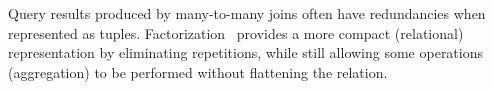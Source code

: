 
Query results produced by many-to-many joins often have redundancies when
represented as tuples. Factorization~\cite{DBLP:journals/sigmod/OlteanuS16}
provides a more compact (relational) representation by eliminating repetitions,
while still allowing some operations (\eg aggregation) to be performed without
flattening the relation.


